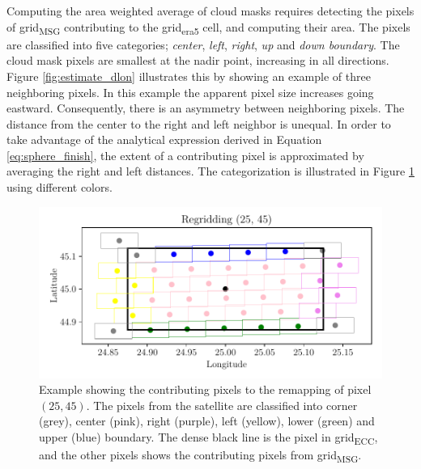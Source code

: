 Computing the area weighted average of cloud masks requires detecting the pixels of grid\textsubscript{MSG}
contributing to the grid\textsubscript{\acrshort{era5}} cell, and computing their area. The pixels are classified into five categories; \textit{center}, \textit{left}, \textit{right}, \textit{up} and \textit{down boundary}.
The cloud mask pixels are smallest at the nadir point, increasing in all directions. Figure \ref{fig:estimate_dlon} illustrates this by showing an example of three neighboring pixels. In this example the apparent pixel size increases going eastward. Consequently, there is an asymmetry between neighboring pixels. The distance from the center to the right and left neighbor is unequal. In order to take advantage of the analytical expression derived in Equation \eqref{eq:sphere_finish}, the extent of a contributing pixel is approximated by averaging the right and left distances. The categorization is illustrated in Figure \ref{fig:pixels_contributing_to_cell} using different colors.

\begin{figure}
    \centering
    \includegraphics{python_figs/example_remapping_lat45_lon25.pdf}
    \caption{Example showing the contributing pixels to the remapping of pixel $(25, 45)$. The pixels from the satellite are classified into corner (grey), center (pink), right (purple), left (yellow), lower (green) and upper (blue) boundary. The dense black line is the pixel in grid\textsubscript{ECC}, and the other pixels shows the contributing pixels from grid\textsubscript{MSG}.}
    \label{fig:pixels_contributing_to_cell}
\end{figure}

